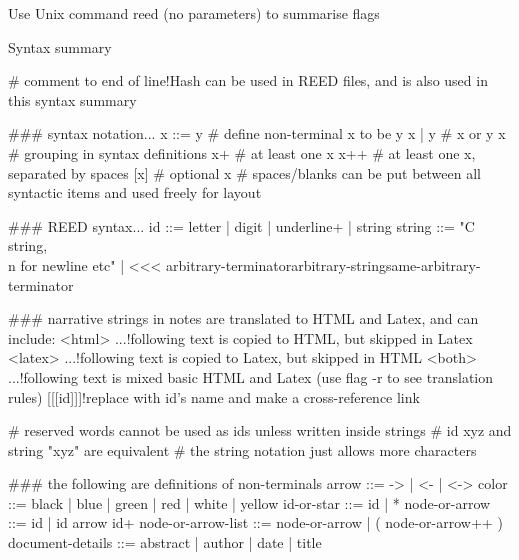 Use Unix command reed (no parameters) to summarise flags

Syntax summary

# comment to end of line!Hash can be used in REED files, and is also used in this syntax summary

### syntax notation...
x ::= y # define non-terminal x to be y
x | y   # x or y
{x}     # grouping in syntax definitions
x+      # at least one x
x++     # at least one x, separated by spaces
[x]     # optional x
        # spaces/blanks can be put between all syntactic items and used freely for layout 

### REED syntax...
id ::= {letter | digit | underline}+ | string
string ::= "C string, \\n for newline etc" | <<< arbitrary-terminator\n                                                        arbitrary-string\n                                                same-arbitrary-terminator

### narrative strings in notes are translated to HTML and Latex, and can include:
<html> ...!following text is copied to HTML, but skipped in Latex
<latex> ...!following text is copied to Latex, but skipped in HTML
<both> ...!following text is mixed basic HTML and Latex (use flag -r to see translation rules)
[[[id]]]!replace with id's name and make a cross-reference link

# reserved words cannot be used as ids unless written inside strings
# id xyz and string "xyz" are equivalent
# the string notation just allows more characters

### the following are definitions of non-terminals
arrow ::= -> | <- | <->
color ::= black | blue | green | red | white | yellow
id-or-star ::= id | *
node-or-arrow ::= id | id {arrow id}+
node-or-arrow-list ::= node-or-arrow | ( node-or-arrow++ )
document-details ::= abstract | author | date | title

